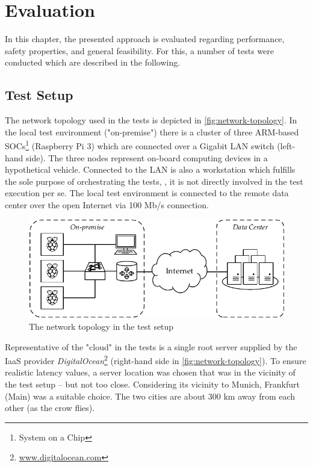 
\chapter{Evaluation}\label{chapter:evaluation}

In this chapter, the presented approach is evaluated regarding performance, safety properties, and general feasibility. For this, a number of tests were conducted which are described in the following.

\section{Test Setup}

The network topology used in the tests is depicted in \autoref{fig:network-topology}. In the local test environment ("on-premise") there is a cluster of three ARM-based SOCs\footnote{System on a Chip} (Raspberry Pi 3) which are connected over a Gigabit LAN switch (left-hand side). The three nodes represent on-board computing devices in a hypothetical vehicle. Connected to the LAN is also a workstation which fulfills the sole purpose of orchestrating the tests, \ie , it is not directly involved in the test execution per se. The local test environment is connected to the remote data center over the open Internet via 100 Mb/s connection.

\begin{figure}[htpb]
  \centering
  \includegraphics[width=\textwidth]{figures/network-setup}
  \caption[Network topology]{The network topology in the test setup}\label{fig:network-topology}
\end{figure}
%
Representative of the "cloud" in the tests is a single root server supplied by the IaaS provider \emph{DigitalOcean}\footnote{\url{www.digitalocean.com}} (right-hand side in \autoref{fig:network-topology}). To ensure realistic latency values, a server location was chosen that was in the vicinity of the test setup -- but not too close. Considering its vicinity to Munich, Frankfurt (Main) was a suitable choice. The two cities are about 300 km away from each other (as the crow flies).

